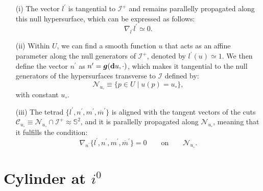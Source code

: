 \begin{itemize}
  \item[(i)] The vector $l^{\prime}$ is tangential to $\mathscr{I}^{+}$ and remains parallelly propagated along this null hypersurface, which can be expressed as follows:
   \begin{equation*}
   \nabla_{l^{\prime}} l^{\prime} \simeq 0.
   \end{equation*}
  \item[(ii)] Within $U$, we can find a smooth function $u$ that acts as an affine parameter along the null generators of $\mathscr{I}^{+}$, denoted by $l^{\prime}(u) \simeq 1$. We then define the vector $n^{\prime}$ as $n^{\prime}=\boldsymbol{g}(\mbox{\textbf{d}}u, \cdot )$, which makes it tangential to the null generators of the hypersurfaces transverse to $\mathscr{I}$ defined by:
  \begin{equation*}
  \mathcal{N}_{u_{\circ}}\equiv \{ p \in U \;| \; u(p)=u_{\circ}\},
  \end{equation*}
   with constant $u_{\circ}$.
  \item[(iii)] The tetrad $\{l^{\prime}, n^{\prime}, m^{\prime}, \overline{m}^{\prime}\}$ is aligned with the tangent vectors of the cuts $\mathcal{C}_{u_{\circ}}\equiv \mathcal{N}_{u_{\circ}}\cap \mathscr{I}^{+} \approx \mathbb{S}^2$, and it is parallelly propagated along $\mathcal{N}_{u_{\circ}}$, meaning that it fulfills the condition:
  \begin{equation*}
  \nabla_{n^{\prime}}\{l^{\prime}, n^{\prime}, m^{\prime}, \overline{m}^{\prime}\}=0 \qquad \text{on} \qquad
  \mathcal{N}_{u_{\circ}}.
  \end{equation*}
  \end{itemize}


  



















\chapter{Cylinder at $i^0$}
\label{chapter:cylinder}

